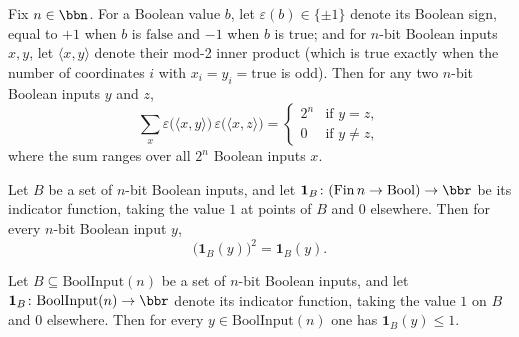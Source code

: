 \begin{lemma}
\label{CommunicationComplexity.Functions.InnerProduct.sum_boolSign_innerProduct_mul_eq_indicator}
\leanok
{}
Fix $n \in \bbn$. For a Boolean value $b$, let $\varepsilon(b) \in \{\pm 1\}$ denote its
Boolean sign, equal to $+1$ when $b$ is $\mathrm{false}$ and $-1$ when $b$ is
$\mathrm{true}$; and for $n$-bit Boolean inputs $x, y$, let $\langle x, y\rangle$ denote
their mod-2 inner product (which is $\mathrm{true}$ exactly when the number of
coordinates $i$ with $x_i = y_i = \mathrm{true}$ is odd). Then for any two $n$-bit
Boolean inputs $y$ and $z$,
\[
\sum_{x} \varepsilon\bigl(\langle x, y\rangle\bigr)\,\varepsilon\bigl(\langle x,
z\rangle\bigr)
  = \begin{cases} 2^n & \text{if } y = z, \\ 0 & \text{if } y \neq z, \end{cases}
\]
where the sum ranges over all $2^n$ Boolean inputs $x$.
\end{lemma}

\begin{lemma}
\label{CommunicationComplexity.Functions.InnerProduct.indicatorOne_sq}
\leanok
{}
Let $B$ be a set of $n$-bit Boolean inputs, and let $\mathbf{1}_B \colon
(\mathrm{Fin}\,n \to \mathrm{Bool}) \to \bbr$ be its indicator function, taking the
value $1$ at points of $B$ and $0$ elsewhere. Then for every $n$-bit Boolean input $y$,
\[ \bigl(\mathbf{1}_B(y)\bigr)^2 = \mathbf{1}_B(y). \]
\end{lemma}

\begin{lemma}
\label{CommunicationComplexity.Functions.InnerProduct.indicatorOne_le_one}
\leanok
{}
Let $B \subseteq \mathrm{BoolInput}(n)$ be a set of $n$-bit Boolean inputs, and let
$\mathbf{1}_B \colon \mathrm{BoolInput}(n) \to \bbr$ denote its indicator function,
taking the value $1$ on $B$ and $0$ elsewhere. Then for every $y \in
\mathrm{BoolInput}(n)$ one has $\mathbf{1}_B(y) \le 1$.
\end{lemma}

